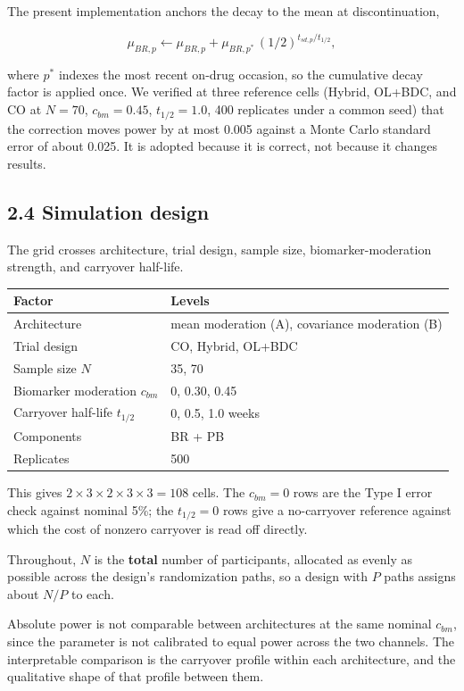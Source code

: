\documentclass[
  11pt,
]{article}
\newcounter{none} %
\begin{document}
The present implementation anchors the decay to the mean at
discontinuation,

\[
\mu_{BR,p} \leftarrow \mu_{BR,p} + \mu_{BR,p^{\ast}}\,
  (1/2)^{t_{sd,p}/t_{1/2}},
\]

where \(p^{\ast}\) indexes the most recent on-drug occasion, so the
cumulative decay factor is applied once. We verified at three
reference cells (Hybrid, OL+BDC, and CO at \(N = 70\), \(c_{bm} = 0.45\),
\(t_{1/2} = 1.0\), 400 replicates under a common seed) that the
correction moves power by at most 0.005 against a Monte Carlo
standard error of about 0.025. It is adopted because it is correct,
not because it changes results.

\subsection{2.4 Simulation design}

The grid crosses architecture, trial design, sample size,
biomarker-moderation strength, and carryover half-life.

{\def\LTcaptype{none} %
\begin{longtable}[]{@{}ll@{}}
\toprule\noalign{}
Factor & Levels \\
\midrule\noalign{}
\endhead
\bottomrule\noalign{}
\endlastfoot
Architecture & mean moderation (A), covariance moderation (B) \\
Trial design & CO, Hybrid, OL+BDC \\
Sample size \(N\) & 35, 70 \\
Biomarker moderation \(c_{bm}\) & 0, 0.30, 0.45 \\
Carryover half-life \(t_{1/2}\) & 0, 0.5, 1.0 weeks \\
Components & BR + PB \\
Replicates & 500 \\
\end{longtable}
}

This gives \(2 \times 3 \times 2 \times 3 \times 3 = 108\) cells. The
\(c_{bm} = 0\) rows are the Type I error check against nominal 5\%; the
\(t_{1/2} = 0\) rows give a no-carryover reference against which the
cost of nonzero carryover is read off directly.

Throughout, \(N\) is the \textbf{total} number of participants,
allocated as evenly as possible across the design's randomization
paths, so a design with \(P\) paths assigns about \(N/P\) to each.

Absolute power is not comparable between architectures at the same
nominal \(c_{bm}\), since the parameter is not calibrated to equal
power across the two channels. The interpretable comparison is the
carryover profile within each architecture, and the qualitative shape
of that profile between them.
\end{document}
